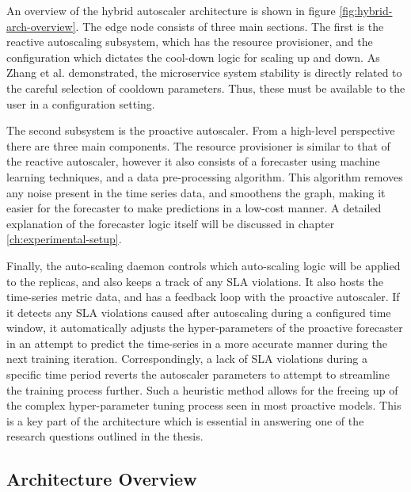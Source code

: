 An overview of the hybrid autoscaler architecture is shown in figure \ref{fig:hybrid-arch-overview}. The edge node consists of three main sections. The first is the reactive autoscaling subsystem, which has the resource provisioner, and the configuration which dictates the cool-down logic for scaling up and down. As Zhang et al. \cite{zhang2019quantifying} demonstrated, the microservice system stability is directly related to the careful selection of cooldown parameters. Thus, these must be available to the user in a configuration setting.\par

The second subsystem is the proactive autoscaler. From a high-level perspective there are three main components. The resource provisioner is similar to that of the reactive autoscaler, however it also consists of a forecaster using machine learning techniques, and a data pre-processing algorithm. This algorithm removes any noise present in the time series data, and smoothens the graph, making it easier for the forecaster to make predictions in a low-cost manner. A detailed explanation of the forecaster logic itself will be discussed in chapter \ref{ch:experimental-setup}.\par

Finally, the auto-scaling daemon controls which auto-scaling logic will be applied to the replicas, and also keeps a track of any SLA violations. It also hosts the time-series metric data, and has a feedback loop with the proactive autoscaler. If it detects any SLA violations caused after autoscaling during a configured time window, it automatically adjusts the hyper-parameters of the proactive forecaster in an attempt to predict the time-series in a more accurate manner during the next training iteration. Correspondingly, a lack of SLA violations during a specific time period reverts the autoscaler parameters to attempt to streamline the training process further. Such a heuristic method allows for the freeing up of the complex hyper-parameter tuning process seen in most proactive models. This is a key part of the architecture which is essential in answering one of the research questions outlined in the thesis.\par


\subsection{Architecture Overview}
\label{subsec:ch3-hybrid-arch}

